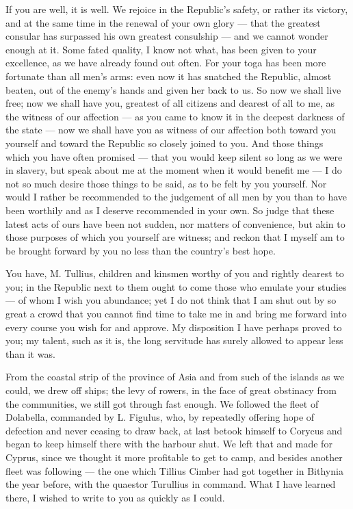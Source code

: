 

 If you are well, it is well. We rejoice in the Republic's safety, or rather its victory, and at the same time in the renewal of your own glory --- that the greatest consular has surpassed his own greatest consulship --- and we cannot wonder enough at it. Some fated quality, I know not what, has been given to your excellence, as we have already found out often. For your toga has been more fortunate than all men's arms: even now it has snatched the Republic, almost beaten, out of the enemy's hands and given her back to us. So now we shall live free; now we shall have you, greatest of all citizens and dearest of all to me, as the witness of our affection --- as you came to know it in the deepest darkness of the state --- now we shall have you as witness of our affection both toward you yourself and toward the Republic so closely joined to you. And those things which you have often promised --- that you would keep silent so long as we were in slavery, but speak about me at the moment when it would benefit me --- I do not so much desire those things to be said, as to be felt by you yourself. Nor would I rather be recommended to the judgement of all men by you than to have been worthily and as I deserve recommended in your own. So judge that these latest acts of ours have been not sudden, nor matters of convenience, but akin to those purposes of which you yourself are witness; and reckon that I myself am to be brought forward by you no less than the country's best hope.

 You have, M. Tullius, children and kinsmen worthy of you and rightly dearest to you; in the Republic next to them ought to come those who emulate your studies --- of whom I wish you abundance; yet I do not think that I am shut out by so great a crowd that you cannot find time to take me in and bring me forward into every course you wish for and approve. My disposition I have perhaps proved to you; my talent, such as it is, the long servitude has surely allowed to appear less than it was.

 From the coastal strip of the province of Asia and from such of the islands as we could, we drew off ships; the levy of rowers, in the face of great obstinacy from the communities, we still got through fast enough. We followed the fleet of Dolabella, commanded by L. Figulus, who, by repeatedly offering hope of defection and never ceasing to draw back, at last betook himself to Corycus and began to keep himself there with the harbour shut. We left that and made for Cyprus, since we thought it more profitable to get to camp, and besides another fleet was following --- the one which Tillius Cimber had got together in Bithynia the year before, with the quaestor Turullius in command. What I have learned there, I wished to write to you as quickly as I could.

